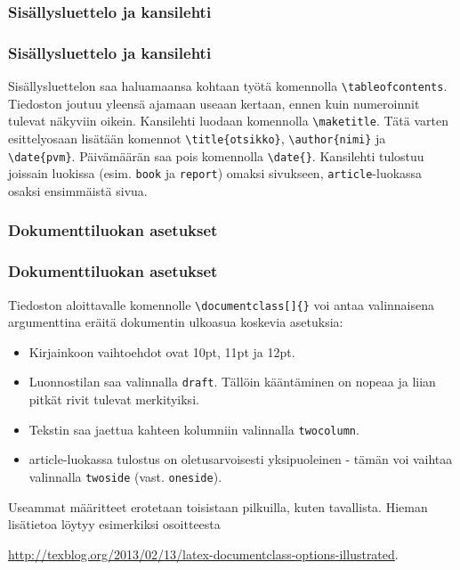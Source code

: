 \subsubsection{Sisällysluettelo ja kansilehti}
\begin{frame}[fragile]
    \frametitle{Sisällysluettelo ja kansilehti}
    Sisällysluettelon saa haluamaansa kohtaan työtä komennolla \verb-\tableofcontents-. Tiedoston joutuu yleensä ajamaan useaan kertaan, ennen kuin numeroinnit tulevat näkyviin oikein.
    \vaihto
    Kansilehti luodaan komennolla \verb-\maketitle-. Tätä varten esittelyosaan lisätään komennot \verb-\title{otsikko}-, \verb-\author{nimi}- ja \verb-\date{pvm}-. Päivämäärän saa pois komennolla \verb-\date{}-.
    \vaihto
    Kansilehti tulostuu joissain luokissa (esim. \verb-book- ja \verb-report-) omaksi sivukseen, \verb-article--luokassa osaksi ensimmäistä sivua.
\end{frame}
\begin{frame}[fragile]
    
    
\end{frame}
\subsubsection{Dokumenttiluokan asetukset}
\begin{frame}[fragile]
    \frametitle{Dokumenttiluokan asetukset}
    Tiedoston aloittavalle komennolle \verb-\documentclass[]{}- voi antaa valinnaisena argumenttina eräitä dokumentin ulkoasua koskevia asetuksia:
    \begin{itemize}
        \item Kirjainkoon vaihtoehdot ovat 10pt, 11pt ja 12pt. 
        \item Luonnostilan saa valinnalla \verb-draft-. Tällöin kääntäminen on nopeaa ja liian pitkät rivit tulevat merkityiksi.
        \item Tekstin saa jaettua kahteen kolumniin valinnalla \verb-twocolumn-. 
        \item article-luokassa tulostus on oletusarvoisesti yksipuoleinen - tämän voi vaihtaa valinnalla \verb-twoside- (vast. \verb-oneside-).
    \end{itemize}
    Useammat määritteet erotetaan toisistaan pilkuilla, kuten tavallista.
    \vaihto
    Hieman lisätietoa löytyy esimerkiksi osoitteesta \begin{scriptsize}
        \url{http://texblog.org/2013/02/13/latex-documentclass-options-illustrated}.
    \end{scriptsize}
\end{frame}
%


